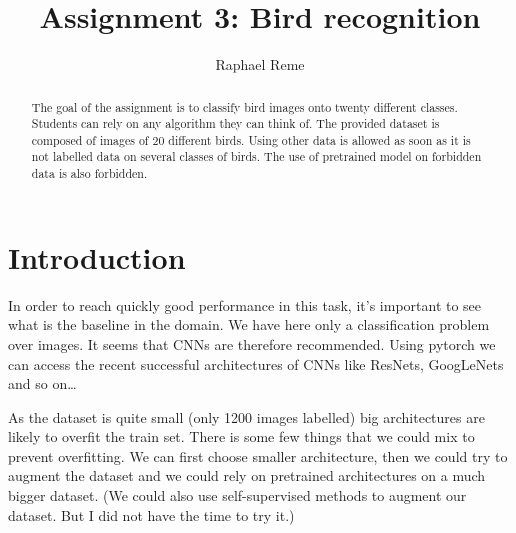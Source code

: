 \documentclass[final]{cvpr}
\begin{document}
\title{Assignment 3: Bird recognition}

\author{Raphael Reme\\
}

\maketitle


\begin{abstract}
   The goal of the assignment is to classify bird images
   onto twenty different classes. Students can rely on any algorithm they can think of.
   The provided dataset is composed of images of 20 different birds. Using other
   data is allowed as soon as it is not labelled data on several classes of birds.
   The use of pretrained model on forbidden data is also forbidden.
\end{abstract}

\section{Introduction}

In order to reach quickly good performance in this task, it's important to see
what is the baseline in the domain. We have here only a classification problem
over images. It seems that CNNs are therefore recommended. Using pytorch we can
access the recent successful architectures of CNNs like ResNets, GoogLeNets
and so on\dots

As the dataset is quite small (only 1200 images labelled) big architectures are likely
to overfit the train set. There is some few things that we could mix to prevent overfitting.
We can first choose smaller architecture, then we could try to augment the dataset and
we could rely on pretrained architectures on a much bigger dataset. (We could also use
self-supervised methods to augment our dataset. But I did not have the time to try it.)
\end{document}
